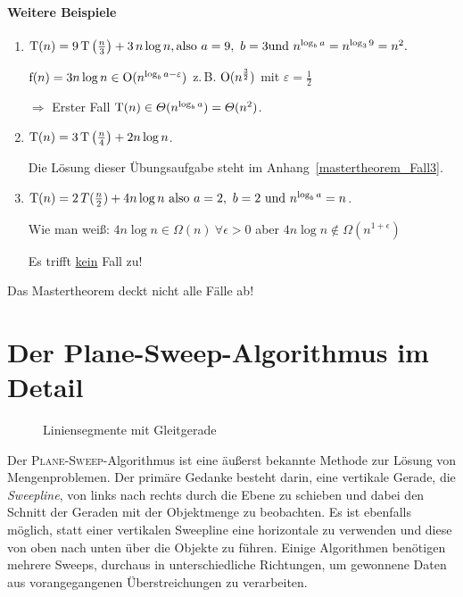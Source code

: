 \documentclass[ngerman]{scrreprt}%
\theoremstyle{break}
\begin{document}
\subsubsection{Weitere Beispiele}
\begin{enumerate}
\item \( \textup{T}(n) = 9\,\textup{T}\left(\frac{n}{3}\right) + 3\,n\log n, \textup{also}\ a = 9,\ b = 3
\textup{und}\ n^{\log_ba} = n^{\log_39} = n^2.\)

\(\textup{f}(n) = 3n\log n \in \textup{O}(n^{\log_ba-\varepsilon}) \)
z.\,B. \(\textup{O}(n^{\frac{3}{2}})\) mit \( \varepsilon = \frac{1}{2} \)

\( \Rightarrow \) Erster Fall \( \textup{T}(n) \in \Theta(n^{\log_ba}) = \Theta (n^2) \).

\item \( \textup{T}(n) = 3\,\textup{T}\left(\frac{n}{4}\right) + 2n\log n\).

Die Lösung dieser Übungsaufgabe steht im Anhang~\autoref{mastertheorem_Fall3}.

\item \( \textup{T}(n) = 2\,T(\frac{n}{2}) + 4n\log n\ \textup{also}\
a = 2,\ b = 2\ \textup{und}\ n^{\log_ba} = n \).

Wie man weiß: \(4n\log n \in \Omega(n)\ \forall \epsilon >0\) aber \(4n\log n \notin \Omega(n^{1+\epsilon})\)
	
Es trifft {\underline {kein}} Fall zu!
\end{enumerate}
Das Mastertheorem deckt nicht alle Fälle ab!
	

\appendix    %

\chapter{Der Plane-Sweep-Algorithmus im Detail}
\label{planesweep}

\begin{figure}
  \centering  
  \caption{Liniensegmente mit Gleitgerade}
  \label{131003d}
\end{figure}

Der \textsc{Plane-Sweep}-Algorithmus ist eine äußerst bekannte
Methode zur Lösung von Mengenproblemen. Der primäre Gedanke
besteht darin, eine vertikale Gerade, die \textit{Sweep\-line}, von
links nach rechts durch die Ebene zu schieben und dabei den
Schnitt der Geraden mit der Objektmenge zu beobachten. Es
ist ebenfalls möglich, statt einer vertikalen Sweepline eine
horizontale zu verwenden und diese von oben nach unten über die
Objekte zu führen. Einige Algorithmen benötigen mehrere Sweeps,
durchaus in unterschiedliche Richtungen, um gewonnene Daten aus
vorangegangenen Überstreich\-ungen zu verarbeiten.
\end{document}
